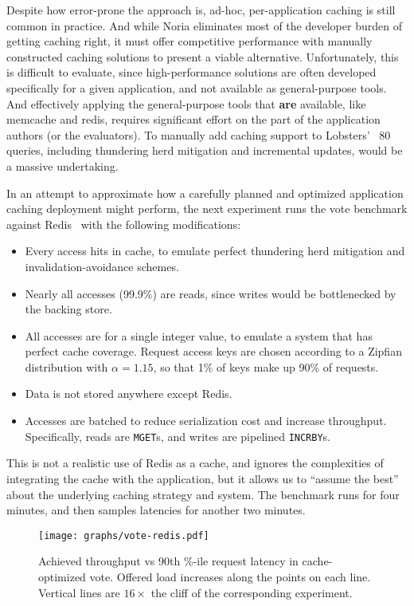Despite how error-prone the approach is, ad-hoc, per-application caching is
still common in practice. And while Noria eliminates most of the developer
burden of getting caching right, it must offer competitive performance with
manually constructed caching solutions to present a viable alternative.
Unfortunately, this is difficult to evaluate, since high-performance solutions
are often developed specifically for a given application, and not available as
general-purpose tools. And effectively applying the general-purpose tools that
\textbf{are} available, like memcache and redis, requires significant effort on
the part of the application authors (or the evaluators). To manually add caching
support to Lobsters' ~80 queries, including thundering herd mitigation and
incremental updates, would be a massive undertaking.

In an attempt to approximate how a carefully planned and optimized application
caching deployment might perform, the next experiment runs the vote benchmark
against Redis~\cite{redis} with the following modifications:

\begin{itemize}
 \item Every access hits in cache, to emulate perfect thundering herd mitigation
   and invalidation-avoidance schemes.
 \item Nearly all accesses (99.9\%) are reads, since writes would be
   bottlenecked by the backing store.
 \item All accesses are for a single integer value, to emulate a system that has
   perfect cache coverage. Request access keys are chosen according to a Zipfian
    distribution with $\alpha = 1.15$, so that 1\% of keys make up 90\% of
    requests.
 \item Data is not stored anywhere except Redis.
 \item Accesses are batched to reduce serialization cost and increase
   throughput. Specifically, reads are \texttt{MGET}s, and writes are pipelined
    \texttt{INCRBY}s.
\end{itemize}

This is not a realistic use of Redis as a cache, and ignores the complexities of
integrating the cache with the application, but it allows us to ``assume the
best'' about the underlying caching strategy and system. The benchmark runs for
four minutes, and then samples latencies for another two minutes.

\begin{figure}[h]
  \centering
  \texttt{[image: graphs/vote-redis.pdf]}
  \caption{Achieved throughput vs 90th \%-ile request latency in cache-optimized
  vote. Offered load increases along the points on each line. Vertical
  lines are $16\times$ the cliff of the corresponding experiment.}
  \label{f:vote-redis}
\end{figure}

